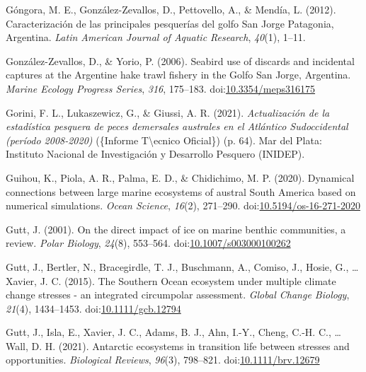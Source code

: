 \documentclass[
]{article}
\newlength{\cslhangindent}
\newlength{\cslentryspacingunit} %
\newenvironment{CSLReferences}[2] %
 {%
  \setlength{\parindent}{0pt}
  \ifodd #1
  \let\oldpar\par
  \def\par{\hangindent=\cslhangindent\oldpar}
  \fi
  \setlength{\parskip}{#2\cslentryspacingunit}
 }%
 {}
\begin{document}
\begin{CSLReferences}{1}{0}
\leavevmode{}%
Góngora, M. E., González-Zevallos, D., Pettovello, A., \& Mendía, L.
(2012). Caracterización de las principales pesquerías del golfo {San
Jorge Patagonia}, {Argentina}. \emph{Latin American Journal of Aquatic
Research}, \emph{40}(1), 1--11.

\leavevmode{}%
González-Zevallos, D., \& Yorio, P. (2006). Seabird use of discards and
incidental captures at the {Argentine} hake trawl fishery in the {Golfo
San Jorge}, {Argentina}. \emph{Marine Ecology Progress Series},
\emph{316}, 175--183.
doi:\href{https://doi.org/10.3354/meps316175}{10.3354/meps316175}

\leavevmode{}%
Gorini, F. L., Lukaszewicz, G., \& Giussi, A. R. (2021).
\emph{{Actualización de la estadística pesquera de peces demersales
australes en el Atlántico Sudoccidental (período 2008-2020)}} (\{Informe
T\textbackslash\textquotesingle ecnico Oficial\}) (p. 64). {Mar del
Plata}: {Instituto Nacional de Investigación y Desarrollo Pesquero
(INIDEP)}.

\leavevmode{}%
Guihou, K., Piola, A. R., Palma, E. D., \& Chidichimo, M. P. (2020).
Dynamical connections between large marine ecosystems of austral {South
America} based on numerical simulations. \emph{Ocean Science},
\emph{16}(2), 271--290.
doi:\href{https://doi.org/10.5194/os-16-271-2020}{10.5194/os-16-271-2020}

\leavevmode{}%
Gutt, J. (2001). On the direct impact of ice on marine benthic
communities, a review. \emph{Polar Biology}, \emph{24}(8), 553--564.
doi:\href{https://doi.org/10.1007/s003000100262}{10.1007/s003000100262}

\leavevmode{}%
Gutt, J., Bertler, N., Bracegirdle, T. J., Buschmann, A., Comiso, J.,
Hosie, G., \ldots{} Xavier, J. C. (2015). The {Southern Ocean} ecosystem
under multiple climate change stresses - an integrated circumpolar
assessment. \emph{Global Change Biology}, \emph{21}(4), 1434--1453.
doi:\href{https://doi.org/10.1111/gcb.12794}{10.1111/gcb.12794}

\leavevmode{}%
Gutt, J., Isla, E., Xavier, J. C., Adams, B. J., Ahn, I.-Y., Cheng,
C.-H. C., \ldots{} Wall, D. H. (2021). Antarctic ecosystems in
transition \textendash{} life between stresses and opportunities.
\emph{Biological Reviews}, \emph{96}(3), 798--821.
doi:\href{https://doi.org/10.1111/brv.12679}{10.1111/brv.12679}


\end{CSLReferences}
\end{document}
